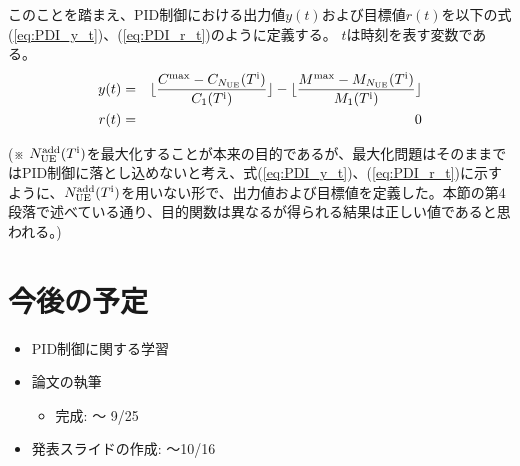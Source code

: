 \documentclass[a4j]{ujarticle}
\begin{document}
このことを踏まえ、PID制御における出力値$y(t)$および目標値$r(t)$を以下の式(\ref{eq:PDI_y_t})、(\ref{eq:PDI_r_t})のように定義する。
$t$は時刻を表す変数である。
\begin{eqnarray}
  y(t) &=& \lfloor \frac{C^{\rm max} - C_{N_{\rm UE}}(T^{\rm i})}{C_{1}(T^{\rm i})} \rfloor - \lfloor \frac{M^{\rm max} - M_{N_{\rm UE}}(T^{\rm i})}{M_{1}(T^{\rm i})} \rfloor
  \label{eq:PDI_y_t} \\
  r(t) &=& 0
  \label{eq:PDI_r_t}
\end{eqnarray}

(※ $N_{\rm UE}^{\rm add}(T^{\rm i})$を最大化することが本来の目的であるが、最大化問題はそのままではPID制御に落とし込めないと考え、式(\ref{eq:PDI_y_t})、(\ref{eq:PDI_r_t})に示すように、$N_{\rm UE}^{\rm add}(T^{\rm i})$を用いない形で、出力値および目標値を定義した。本節の第4段落で述べている通り、目的関数は異なるが得られる結果は正しい値であると思われる。)

  \section{今後の予定}
  \begin{itemize}
    \item PID制御に関する学習
    \item 論文の執筆
    \begin{itemize}
      \item 完成: 〜 9/25
    \end{itemize}
    \item 発表スライドの作成: 〜10/16
  \end{itemize}
%
% 
% 
\end{document}
